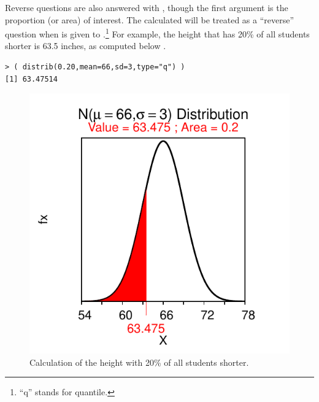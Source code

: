\documentclass[10pt,openany]{book}\usepackage[]{graphicx}\usepackage[]{color}
\makeatletter
\newenvironment{kframe}{%
 \def\at@end@of@kframe{}%
 \ifinner\ifhmode%
  \def\at@end@of@kframe{\end{minipage}}%
  \begin{minipage}{\columnwidth}%
 \fi\fi%
 \def\FrameCommand##1{\hskip\@totalleftmargin \hskip-\fboxsep
 \colorbox{shadecolor}{##1}\hskip-\fboxsep
     \hskip-\linewidth \hskip-\@totalleftmargin \hskip\columnwidth}%
 \MakeFramed {\advance\hsize-\width
   \@totalleftmargin\z@ \linewidth\hsize
   \@setminipage}}%
 {\par\unskip\endMakeFramed%
 \at@end@of@kframe}
\newenvironment{knitrout}{}{} %
\makeatother
\begin{document}
Reverse questions are also answered with , though the first argument is the proportion (or area) of interest.  The calculated will be treated as a ``reverse'' question when  is given to .\footnote{``q'' stands for quantile.}  For example, the height that has 20\% of all students shorter is  63.5 inches, as computed below .
\begin{knitrout}
\color{fgcolor}\begin{kframe}
\begin{verbatim}
> ( distrib(0.20,mean=66,sd=3,type="q") )
[1] 63.47514
\end{verbatim}
\end{kframe}\begin{figure}[hbtp]

{\centering \includegraphics[width=.4\linewidth]{Figs/NormZCalc4-1} 

}

\caption[Calculation of the height with 20\% of all students shorter]{Calculation of the height with 20\% of all students shorter.}\label{fig:NormZCalc4}
\end{figure}


\end{knitrout}
\end{document}
